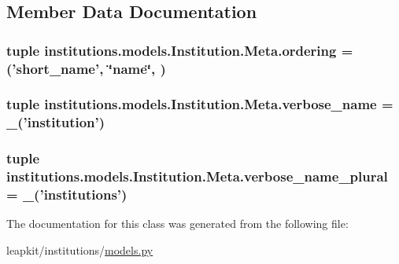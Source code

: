 \subsection{Member Data Documentation}
\hypertarget{classinstitutions_1_1models_1_1_institution_1_1_meta_adaac3b680e0de02775c846456cca50b5}{
\subsubsection[{ordering}]{\setlength{\rightskip}{0pt plus 5cm}tuple institutions.\-models.\-Institution.\-Meta.\-ordering = ('{\bf short\-\_\-name}', \char`\"{}name\char`\"{}, )\hspace{0.3cm}{\ttfamily [static]}}}\label{classinstitutions_1_1models_1_1_institution_1_1_meta_adaac3b680e0de02775c846456cca50b5}
\hypertarget{classinstitutions_1_1models_1_1_institution_1_1_meta_a631e658e31e6fe782933029e03e7602c}{
\subsubsection[{verbose\-\_\-name}]{\setlength{\rightskip}{0pt plus 5cm}tuple institutions.\-models.\-Institution.\-Meta.\-verbose\-\_\-name = \-\_\-('institution')\hspace{0.3cm}{\ttfamily [static]}}}\label{classinstitutions_1_1models_1_1_institution_1_1_meta_a631e658e31e6fe782933029e03e7602c}
\hypertarget{classinstitutions_1_1models_1_1_institution_1_1_meta_a57b359eb54fab0f059028950b752a062}{
\subsubsection[{verbose\-\_\-name\-\_\-plural}]{\setlength{\rightskip}{0pt plus 5cm}tuple institutions.\-models.\-Institution.\-Meta.\-verbose\-\_\-name\-\_\-plural = \-\_\-('institutions')\hspace{0.3cm}{\ttfamily [static]}}}\label{classinstitutions_1_1models_1_1_institution_1_1_meta_a57b359eb54fab0f059028950b752a062}


The documentation for this class was generated from the following file\-:\begin{DoxyCompactItemize}
\item 
leapkit/institutions/\hyperlink{institutions_2models_8py}{models.\-py}\end{DoxyCompactItemize}
